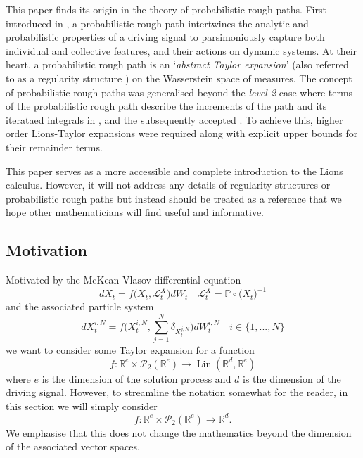 \documentclass[a4paper,11pt,twoside]{article}
\numberwithin{equation}{section}
\theoremstyle{plain}
\newcommand{\bP}{\mathbb{P}}
\newcommand{\bR}{\mathbb{R}}
\newcommand{\cL}{\mathcal{L}}
\newcommand{\cP}{\mathcal{P}}
\DeclareMathOperator{\lin}{Lin}
\newcommand{\1}{\mathbbm{1}}
\begin{document}
	This paper finds its origin in the theory of probabilistic rough paths. First introduced in \cite{2019arXiv180205882.2B}, a probabilistic rough path intertwines the analytic and probabilistic properties of a driving signal to parsimoniously capture both individual and collective features, and their actions on dynamic systems. At their heart, a probabilistic rough path is an `\emph{abstract Taylor expansion}' (also referred to as a regularity structure \cite{hairer2014theory}) on the Wasserstein space of measures. The concept of probabilistic rough paths was generalised beyond the \emph{level 2} case where terms of the probabilistic rough path describe the increments of the path and its iterataed integrals in \cite{2021Probabilistic},  \cite{salkeld2021Probabilistic2} and the subsequently accepted \cite{salkeld2022ExamplePRP}. To achieve this, higher order Lions-Taylor expansions were required along with explicit upper bounds for their remainder terms. 
	
	This paper serves as a more accessible and complete introduction to the Lions calculus. However, it will not address any details of regularity structures or probabilistic rough paths but instead should be treated as a reference that we hope other mathematicians will find useful and informative. 
	
	\subsection{Motivation}
	
	Motivated by the McKean-Vlasov differential equation 
	\begin{equation}
		\label{eq:meanfield:equation}
		dX_{t} = f\Big(X_{t}, \cL^{X}_{t} \Big) dW_{t} \quad \cL_t^X = \bP \circ \big( X_t \big)^{-1}
	\end{equation}
	and the associated particle system
	\begin{equation}
		\label{eq:particle:system}
		dX_{t}^{i, N} = f\Big( X_{t}^{i, N}, \sum_{j=1}^N \delta_{X_t^{j, N}} \Big) dW_{t}^{i, N} \quad i \in \{1, ..., N \}
	\end{equation}
	we want to consider some Taylor expansion for a function
	$$
	f: \bR^e \times \cP_2(\bR^e) \to \lin(\bR^d, \bR^e)
	$$
	where $e$ is the dimension of the solution process and $d$ is the dimension of the driving signal. However, to streamline the notation somewhat for the reader, in this section we will simply consider 
	$$
	f: \bR^e \times \cP_2(\bR^e) \to \bR^d. 
	$$
	We emphasise that this does not change the mathematics beyond the dimension of the associated vector spaces. 
	
\end{document}
